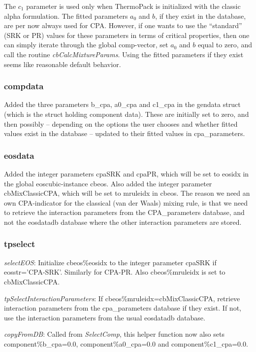 \documentclass[10pt, a4paper]{article}
\begin{document}
The $c_1$ parameter is used only when ThermoPack is initialized with the classic alpha formulation. The fitted parameters $a_0$ and $b$, if they exist in the database, are per now always used for CPA. However, if one wants to use the ``standard'' (SRK or PR) values for these parameters in terms of critical properties, then one can simply iterate through the global comp-vector, set $a_0$ and $b$ equal to zero, and call the routine \textit{cbCalcMixtureParams}. Using the fitted parameters if they exist seems like reasonable default behavior.

\subsubsection*{compdata}
Added the three parameters b\_cpa, a0\_cpa and c1\_cpa in the gendata struct (which is the struct holding component data). These are initially set to zero, and then possibly -- depending on the options the user chooses and whether fitted values exist in the database -- updated to their fitted values in cpa\_parameters.

\subsubsection*{eosdata}
Added the integer parameters cpaSRK and cpaPR, which will be set to eosidx in the global eoscubic-instance cbeos. Also added the integer parameter cbMixClassicCPA, which will be set to mruleidx in cbeos. The reason we need an own CPA-indicator for the classical (van der Waals) mixing rule, is that we need to retrieve the interaction parameters from the CPA\_parameters database, and not the eosdatadb database where the other interaction parameters are stored.

\subsubsection*{tpselect}
\textit{selectEOS}: Initialize cbeos\%eosidx to the integer parameter cpaSRK if eosstr='CPA-SRK'. Similarly for CPA-PR. Also cbeos\%mruleidx is set to cbMixClassicCPA.

\textit{tpSelectInteractionParameters}: If cbeos\%mruleidx=cbMixClassicCPA, retrieve interaction parameters from the cpa\_parameters database if they exist. If not, use the interaction parameters from the usual eosdatadb database.

\textit{copyFromDB}: Called from \textit{SelectComp}, this helper function now also sets component\%b\_cpa=0.0, component\%a0\_cpa=0.0 and component\%c1\_cpa=0.0.
\end{document}
